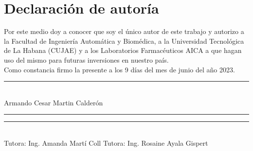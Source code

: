 \documentclass[
	spanish, %
	letterpaper, oneside
]{book}
\begin{document}
\templatePortrait

\templatePagecfg

\newcommand{\keywords}[1]{\par\noindent #1}
\newcommand{\abstracttext}[1]{\par #1}

\newpage
\section*{Declaración de autoría}
Por este medio doy a conocer que soy el único autor de este trabajo y
autorizo a la Facultad de Ingeniería Automática y Biomédica, a la Universidad
Tecnológica de La Habana (CUJAE) y a los Laboratorios Farmacéuticos AICA a
que hagan uso del mismo para futuras inversiones en nuestro país.\\
Como constancia firmo la presente a los 9 días del mes de junio del año
2023.\\

\vspace{2cm}
\begin{center}
	\rule{6cm}{0.4pt}\\
	\vspace{0.5cm}
	Armando Cesar Martin Calderón \\
	\vspace*{3cm}
	\rule{6cm}{0.4pt}
	\hspace*{2cm}
	\rule{6cm}{0.4pt} \\
	\vspace{0.5cm}
	Tutora:	Ing. Amanda Martí Coll
	\hspace*{2cm}
	Tutora: Ing. Rosaine Ayala Gispert
\end{center}


\newpage
\end{document}
